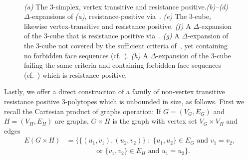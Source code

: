 \documentclass[11pt,a4paper]{amsart}
\begin{document}
\begin{figure}[t!]
\begin{subfigure}[t]{0.24\textwidth}

        \caption{}\label{subfig:delta-expansions-8}
    \end{subfigure}%
    ~
    \caption{\textit{(a)} The $3$-simplex, vertex transitive and resistance positive.\textit{(b)--(d)} $\Delta$-expansions of \textit{(a)}, resistance-positive via~. \textit{(e)} The $3$-cube, likewise vertex-transitive and resistance positive. \textit{(f)} A $\Delta$-expansion of the $3$-cube that is resistance positive via~. \textit{(g)} A $\Delta$-expansion of the $3$-cube not covered by the sufficient criteria of~, yet containing no forbidden face sequences (cf.~). \textit{(h)} A $\Delta$-expansion of the $3$-cube failing the same criteria and containing forbidden face sequences (cf.~) which is resistance positive. 
    }\label{fig:delta-expansions}
\end{figure}

Lastly, we offer a direct construction of a family of non-vertex transitive resistance positive $3$-polytopes which is unbounded in size, as follows. First we recall the Cartesian product of graphs operation: If $G=(V_G, E_G)$ and $H=(V_H, E_H)$ are graphs, $G\times H$ is the graph with vertex set $V_G\times V_H$ and edges
    \begin{align*}
        E(G\times H) &= \{\{ (u_1, v_1), (u_2, v_2)\} \;:\;\{u_1, u_2\}\in E_G\text{ and }v_1 = v_2,\\
        &\qquad\qquad\text{ or }\{v_1, v_2\}\in E_H\text{ and }u_1 = u_2\}.
    \end{align*} 
\end{document}
